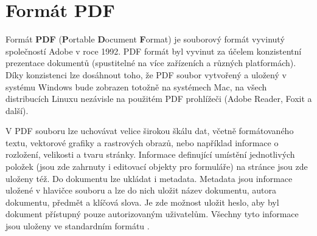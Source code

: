 \chapter{Formát PDF}
Formát \textbf{PDF} (\textbf{P}ortable \textbf{D}ocument \textbf{F}ormat) je souborový formát vyvinutý společností Adobe v roce 1992. PDF formát byl vyvinut za účelem konzistentní prezentace dokumentů (spustitelné na více zařízeních a různých platformách). Díky konzistenci lze dosáhnout toho, že PDF soubor vytvořený a uložený v systému Windows bude zobrazen totožně na systémech Mac, na všech distribucích Linuxu nezávisle na použitém PDF prohlížeči (Adobe Reader, Foxit a další).
\par 
V PDF souboru lze uchovávat velice širokou škálu dat, včetně formátovaného textu, vektorové grafiky a rastrových obrazů, nebo například informace o rozložení, velikosti a tvaru stránky. Informace definující umístění jednotlivých položek (jsou zde zahrnuty i editovací objekty pro formuláře) na stránce jsou zde uloženy též. Do dokumentu lze ukládat i metadata. Metadata jsou informace uložené v hlavičce souboru a lze do nich uložit název dokumentu, autora dokumentu, předmět a klíčová slova. Je zde možnost uložit heslo, aby byl dokument přístupný pouze autorizovaným uživatelům. Všechny tyto informace jsou uloženy ve standardním formátu \cite{PDFTechTerms, PDFWhatIs}.

